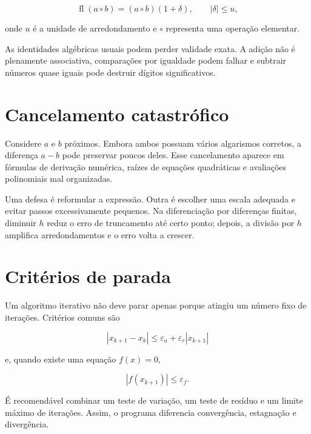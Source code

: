 \documentclass[12pt,a4paper,openany]{book}
\begin{document}
\[\operatorname{fl}(a\circ b)=(a\circ b)(1+\delta),\qquad |\delta|\leq u,\]



onde $u$ é a unidade de arredondamento e $\circ$ representa uma operação elementar.



As identidades algébricas usuais podem perder validade exata. A adição não é plenamente associativa, comparações por igualdade podem falhar e subtrair números quase iguais pode destruir dígitos significativos.



\section{Cancelamento catastrófico}



Considere $a$ e $b$ próximos. Embora ambos possuam vários algarismos corretos, a diferença $a-b$ pode preservar poucos deles. Esse cancelamento aparece em fórmulas de derivação numérica, raízes de equações quadráticas e avaliações polinomiais mal organizadas.



Uma defesa é reformular a expressão. Outra é escolher uma escala adequada e evitar passos excessivamente pequenos. Na diferenciação por diferenças finitas, diminuir $h$ reduz o erro de truncamento até certo ponto; depois, a divisão por $h$ amplifica arredondamentos e o erro volta a crescer.



\section{Critérios de parada}



Um algoritmo iterativo não deve parar apenas porque atingiu um número fixo de iterações. Critérios comuns são



\[|x_{k+1}-x_k|\leq \varepsilon_a+\varepsilon_r|x_{k+1}|\]



e, quando existe uma equação $f(x)=0$,



\[|f(x_{k+1})|\leq \varepsilon_f.\]



É recomendável combinar um teste de variação, um teste de resíduo e um limite máximo de iterações. Assim, o programa diferencia convergência, estagnação e divergência.
\end{document}
